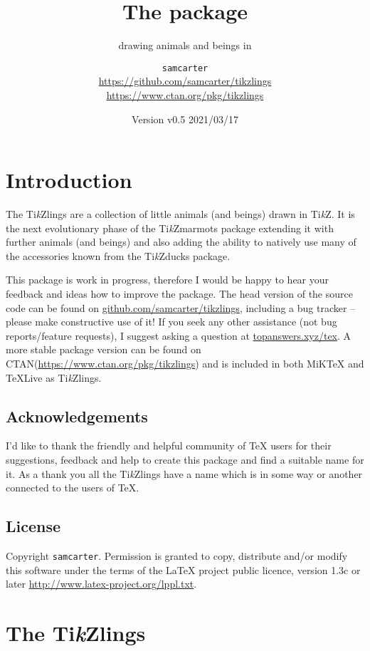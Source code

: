 \documentclass[parskip=half]{scrartcl}
\title{The \texorpdfstring{\tikzlings}{tikzlings} package}
\subtitle{drawing animals and beings in \TikZ}
\author{%
  \texorpdfstring{\texttt{samcarter}\\[0.8em]
    \url{https://github.com/samcarter/tikzlings}\\
    \url{https://www.ctan.org/pkg/tikzlings}
  }{samcarter}}
\date{Version v0.5 \textendash{} 2021/03/17}
\newcommand{\CTAN}{\textsc{CTAN}\xspace}
\newcommand{\TikZ}{Ti\emph{k}Z\xspace}
\newcommand{\tikzducks}{Ti\emph{k}Zducks\xspace}
\newcommand{\tikzmarmots}{Ti\emph{k}Zmarmots\xspace}
\newcommand{\tikzlings}{Ti\emph{k}Zlings\xspace}
\newcommand{\miktex}{MiK\TeX\xspace}
\newcommand{\texlive}{\TeX{}Live\xspace}
\begin{document}
\maketitle
\thispagestyle{scrheadings}

\section*{Introduction}
\label{intro}

The \tikzlings are a collection of little animals (and beings) drawn in \TikZ. It is the next evolutionary phase of the \tikzmarmots package extending it with further animals (and beings) and also adding the ability to natively use many of the accessories known from the \tikzducks package. 

This package is work in progress, therefore I would be happy to hear your feedback and ideas how to improve the package. 
The head version of the source code can be found on \url{github.com/samcarter/tikzlings}, including a bug tracker -- please make constructive use of it! 
If you seek any other assistance (not bug reports/feature requests), I suggest asking a question at \url{topanswers.xyz/tex}.
A more stable package version can be found on \CTAN (\url{https://www.ctan.org/pkg/tikzlings}) and is included in both \miktex and \texlive as \tikzlings. 

\subsection*{Acknowledgements}

I'd like to thank the friendly and helpful community of \TeX{} users for their suggestions, feedback and help to create this package and find a suitable name for it. As a thank you all the \tikzlings have a name which is in some way or another connected to the users of \TeX{}.

\subsection*{License}

Copyright 
\texttt{samcarter}. Permission is granted to copy, distribute and\slash or modify this software under the terms of the LaTeX project public licence, version 1.3c or later \url{http://www.latex-project.org/lppl.txt}.

\clearpage
\section*{The \tikzlings}
\end{document}
